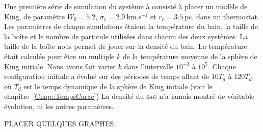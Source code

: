 	Une première série de simulation du système à consisté à placer un modèle de King, de paramètre $W_0 = 5.2$, $\sigma_c = 2.9\
	\mathrm{km}.\mathrm{s}^{-1}$ et $r_c = 3.5\ \mathrm{pc}$, dans un thermostat. Les paramètres de chaque simulations étaient la
	température du bain, la taille de la boîte et le nombre de particule utilisées dans chacun des deux systèmes. La taille de la boîte
	nous permet de jouer sur la densité du bain. La température était calculée pour être un multiple $k$ de la température moyenne de la
	sphère de King initiale. Nous avons fait varier $k$ dans l'intervalle $10^{-3}$ à $10^5$. Chaque configuration initiale a évolué
	sur des périodes de temps allant de $10T_d$ à $120T_d$, où $T_d$ est le temps dynamique de la sphère de King initiale (voir le
	chapitre~\ref{Chap::TempsCarac})
	La densité du \textsc{sag} n'a jamais montré de véritable évolution, ni les autres paramètres.

	PLACER QUELQUES GRAPHES.




